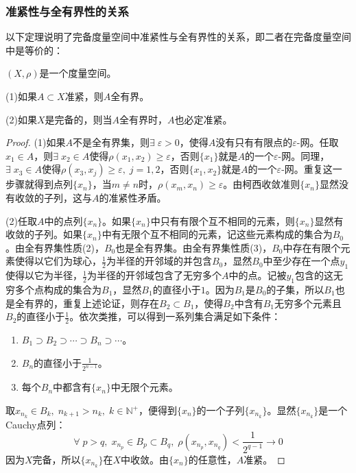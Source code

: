 \subsubsection{准紧性与全有界性的关系}
以下定理说明了完备度量空间中准紧性与全有界性的关系，即二者在完备度量空间中是等价的：
\begin{theorem}
	$(X,\rho)$是一个度量空间。\par
	(1)如果$A\subset X$准紧，则$A$全有界。\par
	(2)如果$X$是完备的，则当$A$全有界时，$A$也必定准紧。\par
\end{theorem}
\begin{proof}
	(1)如果$A$不是全有界集，则$\exists\;\varepsilon>0$，使得$A$没有只有有限点的$\varepsilon$-网。任取$x_1\in A$，则$\exists\;x_2\in A$使得$\rho(x_1,x_2)\geqslant\varepsilon$，否则$\{x_1\}$就是$A$的一个$\varepsilon$-网。同理，$\exists\;x_3\in A$使得$\rho(x_3,x_j)\geqslant\varepsilon,\;j=1,2$，否则$\{x_1,x_2\}$就是$A$的一个$\varepsilon$-网。重复这一步骤就得到点列$\{x_n\}$，当$m\ne n$时，$\rho(x_m,x_n)\geqslant\varepsilon$。由柯西收敛准则$\{x_n\}$显然没有收敛的子列，这与$A$的准紧性矛盾。\par
	(2)任取$A$中的点列$\{x_n\}$。如果$\{x_n\}$中只有有限个互不相同的元素，则$\{x_n\}$显然有收敛的子列。如果$\{x_n\}$中有无限个互不相同的元素，记这些元素构成的集合为$B_0$。由全有界集性质(2)，$B_0$也是全有界集。由全有界集性质(3)，$B_0$中存在有限个元素使得以它们为球心，$\frac{1}{2}$为半径的开邻域的并包含$B_0$，显然$B_0$中至少存在一个点$y_1$使得以它为半径，$\frac{1}{2}$为半径的开邻域包含了无穷多个$A$中的点。记被$y_1$包含的这无穷多个点构成的集合为$B_1$，显然$B_1$的直径小于$1$。因为$B_1$是$B_0$的子集，所以$B_1$也是全有界的，重复上述论证，则存在$B_2\subset B_1$，使得$B_2$中含有$B_1$无穷多个元素且$B_2$的直径小于$\frac{1}{2}$。依次类推，可以得到一系列集合满足如下条件：
	\begin{enumerate}
		\item $B_1\supset B_2\supset\cdots\supset B_n\supset\cdots$。
		\item $B_n$的直径小于$\frac{1}{2^{n-1}}$。
		\item 每个$B_n$中都含有$\{x_n\}$中无限个元素。
	\end{enumerate}
	取$x_{n_k}\in B_k,\;n_{k+1}>n_k,\;k\in\mathbb{N}^+$，便得到$\{x_n\}$的一个子列$\{x_{n_k}\}$。显然$\{x_{n_k}\}$是一个Cauchy点列：
	\begin{equation*}
		\forall\;p>q,\;x_{n_p}\in B_p\subset B_q,\;\rho(x_{n_p},x_{n_q})<\frac{1}{2^{q-1}}\to0
	\end{equation*}	
	因为$X$完备，所以$\{x_{n_k}\}$在$X$中收敛。由$\{x_n\}$的任意性，$A$准紧。
\end{proof}
